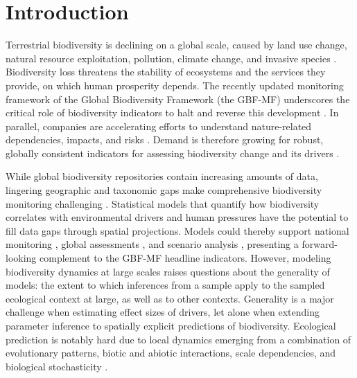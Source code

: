 
\section*{Introduction}

Terrestrial biodiversity is declining on a global scale\cite{leclere2020, ipbes2019, keck2025}, caused by land use change, natural resource exploitation, pollution, climate change, and invasive species \cite{keck2025,jaureguiberry2022}. Biodiversity loss threatens the stability of ecosystems and the services they provide, on which human prosperity depends\cite{cardinale2012}. The recently updated monitoring framework \cite{gbfmf2025} of the Global Biodiversity Framework \cite{gbf2022} (the GBF-MF) underscores the critical role of biodiversity indicators to halt and reverse this development \cite{affinito2024}. In parallel, companies are accelerating efforts to understand nature-related dependencies, impacts, and risks \cite{sbtn2020,tnfd2023,npi2025,goodsell2025}. Demand is therefore growing for robust, globally consistent indicators for assessing biodiversity change and its drivers \cite{burgess2024}.

While global biodiversity repositories contain increasing amounts of data, lingering geographic and taxonomic gaps make comprehensive biodiversity monitoring challenging \cite{hughes2021,chapman2024,boyd2023}. Statistical models that quantify how biodiversity correlates with environmental drivers and human pressures\cite{purvis2025} have the potential to fill data gaps through spatial projections. Models could thereby support national monitoring \cite{gbfmf2025}, global assessments \cite{ipbes2019}, and scenario analysis \cite{damania2023,leclere2020, zurell2025}, presenting a forward-looking complement to the GBF-MF headline indicators\cite{purvis2025,zurell2025}. However, modeling biodiversity dynamics at large scales raises questions about the generality of models: the extent to which inferences from a sample apply to the sampled ecological context at large, as well as to other contexts\cite{spake2022}. Generality is a major challenge when estimating effect sizes of drivers\cite{spake2022}, let alone when extending parameter inference to spatially explicit predictions of biodiversity. Ecological prediction is notably hard due to local dynamics emerging from a combination of evolutionary patterns, biotic and abiotic interactions, scale dependencies, and biological stochasticity \cite{maris2018}.

